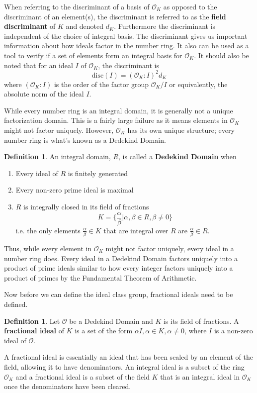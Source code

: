 \documentclass[12pt]{article}
\theoremstyle{definition}
\newtheorem{definition}[theorem]{Definition}
\begin{document}
When referring to the discriminant of a basis of $\mathcal{O}_K$ as opposed to the discriminant of an element(s), the discriminant is referred to as
the \textbf{field discriminant} of $K$ and denoted $d_K$.  Furthermore the discriminant is independent of the choice of integral basis. The discriminant gives us important
information about how ideals factor in the number ring. It also can be used as a tool to verify if a set of elements form an integral basis for $\mathcal{O}_K$. It should also be noted that
for an ideal $I$ of $\mathcal{O}_K$, the discriminant is
\[\text{disc}(I)=(\mathcal{O}_K:I)^2d_K\]
where $(\mathcal{O}_K:I)$ is the order of the factor group $\mathcal{O}_K/I$ or equivalently, the absolute norm of the ideal $I$. 

While every number ring is an integral domain, it is generally not a unique factorization domain. This is a fairly large failure as it means elements in $\mathcal{O}_K$ might not factor uniquely.
However, $\mathcal{O}_K$ has its own unique structure; every number ring is what's known as a Dedekind Domain. 

\begin{definition}
    An integral domain, $R$, is called a \textbf{Dedekind Domain} when
    \begin{enumerate}
        \item[(i)] Every ideal of $R$ is finitely generated
        \item[(ii)] Every non-zero prime ideal is maximal
        \item[(iii)] $R$ is integrally closed in its field of fractions
        \[ K = \{ \frac{\alpha}{\beta} | \alpha, \beta \in R, \beta \neq 0 \}\]
        i.e. the only elements $\frac{\alpha}{\beta}\in K$ that are integral over $R$ are $\frac{\alpha}{\beta}\in R$.
    \end{enumerate}
\end{definition}

Thus, while every element in $\mathcal{O}_K$ might not factor uniquely, every ideal in a number ring does. Every ideal in a Dedekind Domain factors
uniquely into a product of prime ideals similar to how every integer factors uniquely into a product of primes by the Fundamental Theorem of Arithmetic. 

Now before we can define the ideal class group, fractional ideals need to be defined. 
\begin{definition}
    Let $\mathcal{O}$ be a Dedekind Domain and $K$ is its field of fractions. A \textbf{fractional ideal} of $K$ is a set of the form $\alpha I, \alpha \in K, \alpha \neq 0$, where $I$ is a non-zero ideal of $\mathcal{O}$.
\end{definition}
A fractional ideal is essentially an ideal that has been scaled by an element of the field, allowing it to have denominators.
An integral ideal is a subset of the ring $\mathcal{O}_K$ and a fractional ideal is a subset of the field $K$ that is an
integral ideal in $\mathcal{O}_K$ once the denominators have been cleared. 
\end{document}
